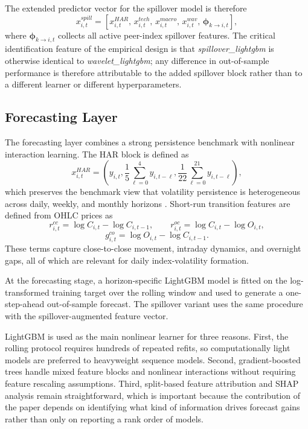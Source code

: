 The extended predictor vector for the spillover model is therefore
\[
x_{i,t}^{spill}=
\left[
x_{i,t}^{HAR},\,
x_{i,t}^{tech},\,
x_{i,t}^{macro},\,
x_{i,t}^{wav},\,
\bm{\phi}_{k\to i,t}
\right],
\]
where \(\bm{\phi}_{k\to i,t}\) collects all active peer-index spillover features. The critical identification feature of the empirical design is that \textit{spillover\_lightgbm} is otherwise identical to \textit{wavelet\_lightgbm}; any difference in out-of-sample performance is therefore attributable to the added spillover block rather than to a different learner or different hyperparameters.

\subsection{Forecasting Layer}

The forecasting layer combines a strong persistence benchmark with nonlinear interaction learning. The HAR block is defined as
\[
x_{i,t}^{HAR}=
\left(
y_{i,t},
\frac{1}{5}\sum_{\ell=0}^{4}y_{i,t-\ell},
\frac{1}{22}\sum_{\ell=0}^{21}y_{i,t-\ell}
\right),
\]
which preserves the benchmark view that volatility persistence is heterogeneous across daily, weekly, and monthly horizons \cite{corsi2008har}. Short-run transition features are defined from OHLC prices as
\[
r_{i,t}^{cc}=\log C_{i,t}-\log C_{i,t-1},\qquad
r_{i,t}^{oc}=\log C_{i,t}-\log O_{i,t},
\]
\[
g_{i,t}^{co}=\log O_{i,t}-\log C_{i,t-1}.
\]
These terms capture close-to-close movement, intraday dynamics, and overnight gaps, all of which are relevant for daily index-volatility formation.

At the forecasting stage, a horizon-specific LightGBM model is fitted on the log-transformed training target over the rolling window and used to generate a one-step-ahead out-of-sample forecast. The spillover variant uses the same procedure with the spillover-augmented feature vector.

LightGBM \cite{ke2017lightgbm} is used as the main nonlinear learner for three reasons. First, the rolling protocol requires hundreds of repeated refits, so computationally light models are preferred to heavyweight sequence models. Second, gradient-boosted trees handle mixed feature blocks and nonlinear interactions without requiring feature rescaling assumptions. Third, split-based feature attribution and SHAP analysis remain straightforward, which is important because the contribution of the paper depends on identifying what kind of information drives forecast gains rather than only on reporting a rank order of models.

